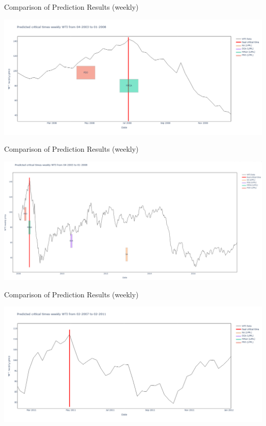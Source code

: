 \documentclass{beamer}
\begin{document}
\begin{frame}{Comparison of Prediction Results (weekly)}
    \begin{center}
        \includegraphics[width=\textwidth]{plot_overlead/weekly_WTI_1.png}
    \end{center}
\end{frame}

\begin{frame}{Comparison of Prediction Results (weekly)}
    \begin{center}
        \includegraphics[width=\textwidth]{plot_overlead/weekly_WTI_1_all_price.png}
    \end{center}
\end{frame}

\begin{frame}{Comparison of Prediction Results (weekly)}
    \begin{center}
        \includegraphics[width=\textwidth]{plot_overlead/weekly_WTI_2.png}
    \end{center}
\end{frame}
\end{document}
